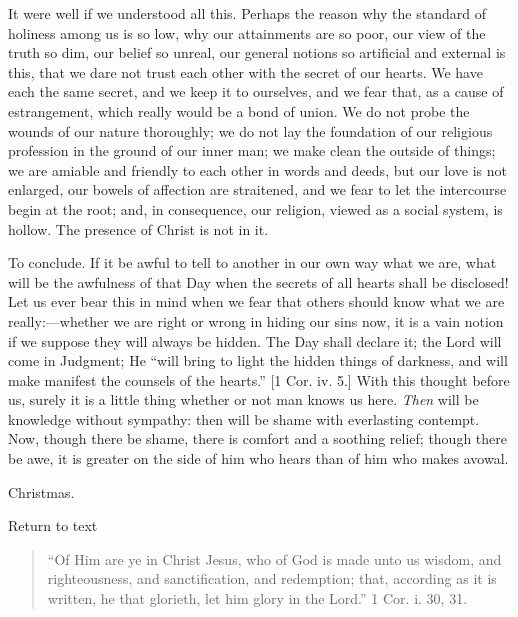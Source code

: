 It were well if we understood all this. Perhaps the reason why the
standard of holiness among us is so low, why our attainments are so
poor, our view of the truth so dim, our belief so unreal, our general
notions so artificial and external is this, that we dare not trust
each other with the secret of our hearts. We have each the same
secret, and we keep it to ourselves, and we fear that, as a cause of
estrangement, which really would be a bond of union. We do not probe
the wounds of our nature thoroughly; we do not lay the foundation of
our religious profession in the ground of our inner man; we make clean
the outside of things; we are amiable and friendly to each other in
words and deeds, but our love is not enlarged, our bowels of affection
are straitened, and we fear to let the intercourse begin at the root;
and, in consequence, our religion, viewed as a social system, is
hollow. The presence of Christ is not in it.

To conclude. If it be awful to tell to another in our own way what
we are, what will be the awfulness of that Day when the secrets of all
hearts shall be disclosed! Let us ever bear this in mind when we fear
that others should know what we are really:—whether we are right or
wrong in hiding our sins now, it is a vain notion if we suppose they
will always be hidden. The Day shall declare it; the Lord will come in
Judgment; He ``will bring to light the hidden things of darkness,
and will make manifest the counsels of the hearts.'' [1 Cor. iv.
5.] With this thought before us, surely it is a little thing whether
or not man knows us here. \emph{Then} will be knowledge without
sympathy: then will be shame with everlasting contempt. Now, though
there be shame, there is comfort and a soothing relief; though there
be awe, it is greater on the side of him who hears than of him who
makes avowal.


Christmas.

Return to text


\begin{quote}

``Of Him are ye in Christ Jesus, who of God is made unto us
wisdom, and righteousness, and sanctification, and redemption; that,
according as it is written, he that glorieth, let him glory in the
Lord.'' 1 Cor. i. 30, 31.

\end{quote}

